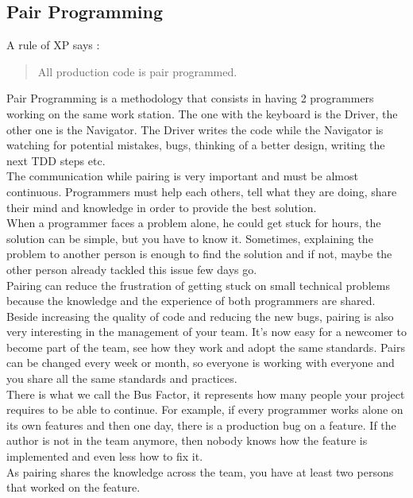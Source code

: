 \subsection{Pair Programming}\label{subsec:pair-programming}
A rule of XP says :
\begin{quotation}
    All production code is pair programmed.
\end{quotation}
Pair Programming is a methodology that consists in having 2 programmers
working on the same work station.
The one with the keyboard is the Driver, the other one is the Navigator.
The Driver writes the code while the Navigator is watching for potential
mistakes, bugs, thinking of a better design, writing the next TDD steps
etc. \\
\newline
The communication while pairing is very important and must be almost
continuous.
Programmers must help each others, tell what they are doing, share their
mind and knowledge in order to provide the best solution. \\
When a programmer faces a problem alone, he could get stuck for hours,
the solution can be simple, but you have to know it.
Sometimes, explaining the problem to another person is enough to find
the solution and if not, maybe the other person already tackled this
issue few days go. \\
Pairing can reduce the frustration of getting stuck on small technical
problems because the knowledge and the experience of both programmers
are shared. \\
\newline
Beside increasing the quality of code and reducing the new bugs, pairing
is also very interesting in the management of your team.
It's now easy for a newcomer to become part of the team, see how they
work and adopt the same standards.
Pairs can be changed every week or month, so everyone is working with
everyone and you share all the same standards and practices. \\
There is what we call the Bus Factor, it represents how many people your
project requires to be able to continue.
For example, if every programmer works alone on its own features and
then one day, there is a production bug on a feature.
If the author is not in the team anymore, then nobody knows how the
feature is implemented and even less how to fix it. \\
As pairing shares the knowledge across the team, you have at least two
persons that worked on the feature.
